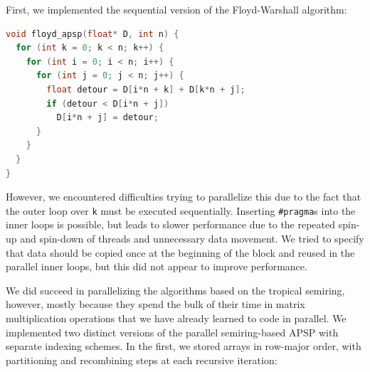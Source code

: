 \documentclass[12pt]{article}
\newcommand*{\ttfamilywithbold}{\fontfamily{lmtt}\selectfont}
\begin{document}
First, we implemented the sequential version of the Floyd-Warshall algorithm:

\begin{lstlisting}[language=C,basicstyle=\ttfamilywithbold\footnotesize]
void floyd_apsp(float* D, int n) {
  for (int k = 0; k < n; k++) {
    for (int i = 0; i < n; i++) {
      for (int j = 0; j < n; j++) {
        float detour = D[i*n + k] + D[k*n + j];
        if (detour < D[i*n + j])
          D[i*n + j] = detour;
      }
    }
  }
}
\end{lstlisting}

However, we encountered difficulties trying to parallelize this due to the fact that the outer loop over \texttt{k} must be executed sequentially. Inserting \texttt{\#pragma}s into the inner loops is possible, but leads to slower performance due to the repeated spin-up and spin-down of threads and unnecessary data movement. We tried to specify that data should be copied once at the beginning of the block and reused in the parallel inner loops, but this did not appear to improve performance.

We did succeed in parallelizing the algorithms based on the tropical semiring, however, mostly because they spend the bulk of their time in matrix multiplication operations that we have already learned to code in parallel. We implemented two distinct versions of the parallel semiring-based APSP with separate indexing schemes. In the first, we stored arrays in row-major order, with partitioning and recombining steps at each recursive iteration:
\end{document}
